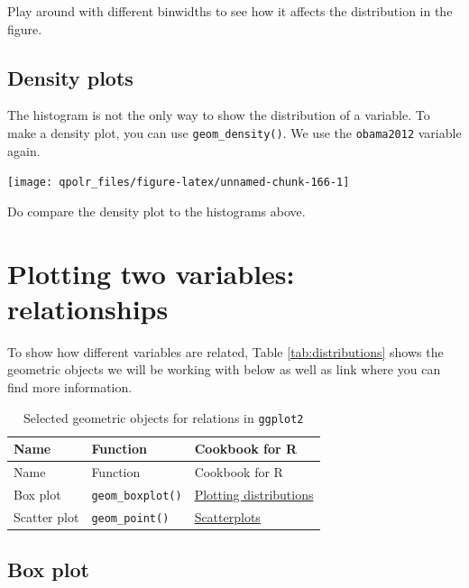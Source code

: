 \documentclass[12pt,oneside]{reedthesis}
\theoremstyle{definition}
\theoremstyle{definition}
\theoremstyle{definition}
\theoremstyle{remark}
\begin{document}
  Play around with different binwidths to see how it affects the
  distribution in the figure.
  
  \subsection{Density plots}\label{density-plots}
  
  The histogram is not the only way to show the distribution of a
  variable. To make a density plot, you can use \texttt{geom\_density()}.
  We use the \texttt{obama2012} variable again.
  \begin{Shaded}
  \begin{Highlighting}[]
  \NormalTok{(}\OperatorTok{+}
  \StringTok{  }\NormalTok{() }
  \end{Highlighting}
  \end{Shaded}
  \begin{center}\texttt{[image: qpolr\_files/figure-latex/unnamed-chunk-166-1]} \end{center}
  
  Do compare the density plot to the histograms above.
  
  \section{Plotting two variables:
  relationships}\label{plotting-two-variables-relationships}
  
  To show how different variables are related, Table
  \ref{tab:distributions} shows the geometric objects we will be working
  with below as well as link where you can find more information.
  \begin{longtable}[]{@{}lll@{}}
  \caption{\label{tab:relationships} Selected geometric objects for relations
  in \texttt{ggplot2}}\tabularnewline
  \toprule
  Name & Function & Cookbook for R\tabularnewline
  \midrule
  \endfirsthead
  \toprule
  Name & Function & Cookbook for R\tabularnewline
  \midrule
  \endhead
  Box plot & \texttt{geom\_boxplot()} &
  \href{http://www.cookbook-r.com/Graphs/Plotting_distributions_(ggplot2)/}{Plotting
  distributions}\tabularnewline
  Scatter plot & \texttt{geom\_point()} &
  \href{http://www.cookbook-r.com/Graphs/Scatterplots_(ggplot2)/}{Scatterplots}\tabularnewline
  \bottomrule
  \end{longtable}
  \subsection{Box plot}\label{box-plot}
  
\end{document}
